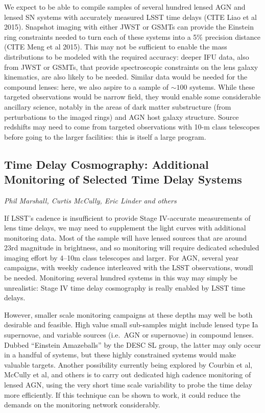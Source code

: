 We expect to be able to compile samples of several hundred lensed AGN
and  lensed SN systems with accurately measured LSST time delays (CITE
Liao et al 2015). Snapshot imaging with either JWST or GSMTs can provide
the Einstein ring constraints needed to turn each of these systems into
a  5\% precision distance (CITE Meng et al 2015). This may not be
sufficient to enable the mass distributions to be modeled with the
required accuracy: deeper IFU data, also from JWST or GSMTs, that
provide spectroscopic constraints on the lens galaxy kinematics, are
also likely to be needed.  Similar data would be needed for the compound
lenses: here, we also  aspire to a sample of $\sim 100$ systems. While
these targeted observations would be narrow field, they would enable
some considerable ancillary science, notably  in the areas of dark
matter substructure (from perturbations to the imaged rings) and AGN
host galaxy structure. Source redshifts may  need to come from targeted
observations with 10-m class telescopes  before going to the larger
facilities: this is itself a large program.



\subsection{Time Delay Cosmography: Additional Monitoring of Selected Time Delay Systems}
{\it Phil Marshall, Curtis McCully, Eric Linder and others}

If LSST's cadence is insufficient to provide Stage IV-accurate
measurements of lens time delays, we may need to supplement the light
curves with additional monitoring data. Most of the sample will have
lensed sources that are around 23rd magnitude in brightness, and so
monitoring will require dedicated scheduled imaging effort by 4--10m
class telescopes and larger. For AGN, several year campaigns, with
weekly cadence interleaved with the LSST observations, woudl be needed.
Monitoring several hundred systems in this way may simply be
unrealistic: Stage IV time delay cosmography is really enabled by LSST
time delays.

However, smaller scale monitoring campaigns at these depths may well be
both desirable and feasible. High value small sub-samples might include
lensed type Ia supernovae, and variable sources (i.e.\ AGN or
supernovae) in compound lenses. Dubbed ``Einstein Amazeballs'' by the
DESC SL group, the latter may only occur in a handful of systems, but
these highly constrained systems would make valuable targets. Another
possibility currently being explored by Courbin et al, McCully et al,
and others is to carry out dedicated high cadence monitoring of lensed
AGN, using the very short time scale variability to probe the time delay
more efficiently. If this technique can be shown to work, it could
reduce the demands on the monitoring network considerably.

